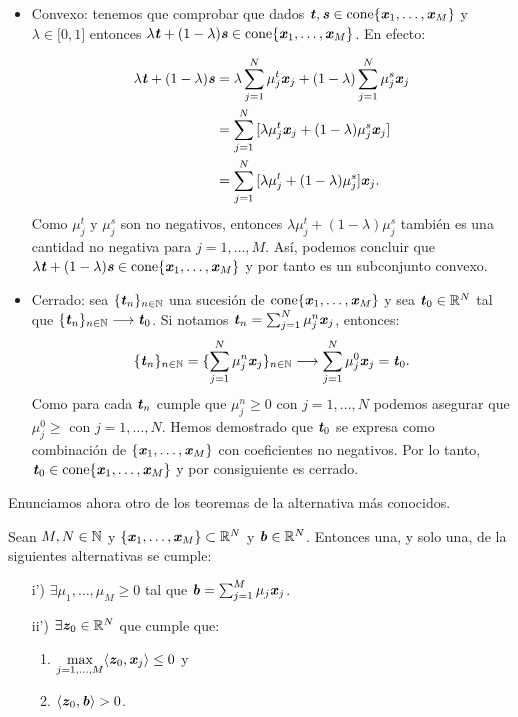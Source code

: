 \begin{itemize}
	\item  Convexo: tenemos que comprobar que dados $ \textbf{\emph{t}}, \textbf{\emph{s}} \in \mathrm{cone}\{\textbf{\emph{x}}_1,\dots, \textbf{\emph{x}}_M \} $ y $ \lambda \in \lbrack 0,1 \rbrack $ entonces $ \lambda\textbf{\emph{t}} + (1-\lambda)\textbf{\emph{s}} \in \mathrm{cone}\{\textbf{\emph{x}}_1,\dots, \textbf{\emph{x}}_M \} $. En efecto:
	
	\begin{equation*}
	\begin{split}
	\lambda\textbf{\emph{t}} + (1-\lambda)\textbf{\emph{s}} &=   \lambda \sum_{j=1}^{N}{\mu_j^t \textbf{\emph{x}}_j } + (1-\lambda)\sum_{j=1}^{N}{\mu_j^s \textbf{\emph{x}}_j } \\
	&= \sum_{j=1}^{N}{\lbrack \lambda \mu_j^t \textbf{\emph{x}}_j  + (1-\lambda)\mu_j^s\textbf{\emph{x}}_j \rbrack} \\
	&= \sum_{j=1}^{N}{\lbrack \lambda \mu_j^t  + (1-\lambda)\mu_j^s \rbrack \textbf{\emph{x}}_j}.
	\end{split}
	\end{equation*}
	Como $ \mu_j^t \text{ y } \mu_j^s $ son no negativos, entonces $ \lambda \mu_j^t  + (1-\lambda)\mu_j^s  $ también es una cantidad no negativa para $ j=1,\dots,M $. Así, podemos concluir que $ \lambda\textbf{\emph{t}} + (1-\lambda)\textbf{\emph{s}} \in \mathrm{cone}\{\textbf{\emph{x}}_1,\dots, \textbf{\emph{x}}_M \} $ y por tanto es un subconjunto convexo.
	
	\item Cerrado: sea $ \lbrace \textbf{\emph{t}}_n \rbrace_{ n \in \mathbb{N}} $ una sucesión de $ \mathrm{cone}\{\textbf{\emph{x}}_1,\dots, \textbf{\emph{x}}_M \} $ y sea $ \textbf{\emph{t}}_0 \in \mathbb{R}^N $ tal que $ \lbrace \textbf{\emph{t}}_n \rbrace_{ n \in \mathbb{N}} \longrightarrow \textbf{\emph{t}}_0 $. Si notamos $ \textbf{\emph{t}}_n = \sum_{j=1}^{N}{\mu_j^n \textbf{\emph{x}}_j }$, entonces:
	\[
	\lbrace \textbf{\emph{t}}_n \rbrace_{ n \in \mathbb{N}} = \lbrace \sum_{j=1}^{N}{\mu_j^n \textbf{\emph{x}}_j } \rbrace_{ n \in \mathbb{N}} \longrightarrow \sum_{j=1}^{N}{\mu_j^0 \textbf{\emph{x}}_j } = \textbf{\emph{t}}_0.
	\]
	Como para cada $ \textbf{\emph{t}}_n $ cumple que $ \mu_j^n \geq 0$ con $ j=1,\dots,N $ podemos asegurar que $ \mu_j^0 \geq $ con $ j=1,\dots,N $. Hemos demostrado que $ \textbf{\emph{t}}_0 $ se expresa como combinación de $ \{\textbf{\emph{x}}_1,\dots, \textbf{\emph{x}}_M \} $ con coeficientes no negativos. Por lo tanto, $ \textbf{\emph{t}}_0 \in \mathrm{cone}\{\textbf{\emph{x}}_1,\dots, \textbf{\emph{x}}_M \}  $ y por consiguiente es cerrado. 
\end{itemize} 

Enunciamos ahora otro de los teoremas de la alternativa más conocidos.
\bigskip
\begin{lemaBox}[Farkas]
	Sean $ M,N \in \mathbb{N} $ y $ \{\textbf{\emph{x}}_1,\dots, \textbf{\emph{x}}_M \} \subset \mathbb{R}^N $ y $ \textbf{\emph{b}} \in \mathbb{R}^N $. Entonces una, y solo una, de la siguientes alternativas se cumple:
	\begin{itemize}
		\item[i')] $ \exists \mu_1,\dots,\mu_M \geq 0 $ tal que $ \textbf{\emph{b}} = \sum_{j=1}^{M} \mu_j \textbf{\emph{x}}_j$.
		\item[ii')]$ \exists \textbf{\emph{z}}_0 \in \mathbb{R}^N $ que cumple que:
		\begin{enumerate}
			\item $ \displaystyle\max_{ j=1,\dots,M} \langle \textbf{\emph{z}}_0, \textbf{\emph{x}}_j \rangle \leq 0$ y
			\item $ \langle \textbf{\emph{z}}_0, \textbf{\emph{b}}\rangle > 0$.
		\end{enumerate} 
	\end{itemize}
\end{lemaBox}

